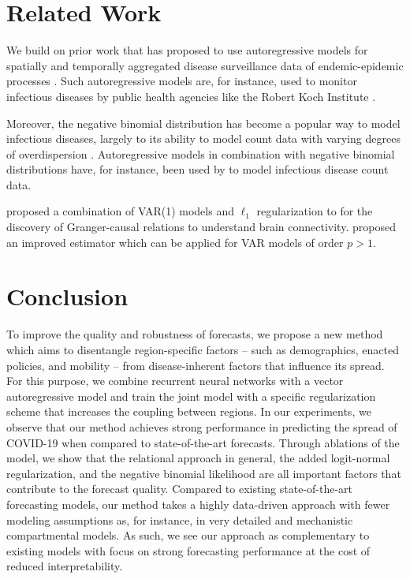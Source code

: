 \documentclass{article}
\begin{document}
\section{Related Work}
\label{sec:org3676b8c}
We build on prior work that has proposed to use autoregressive models
for spatially and temporally aggregated disease surveillance data of endemic-epidemic
processes \citep{held2005statistical,meyer2014powerlaw,meyer2016socialcontact}.
Such autoregressive models are, for instance, used to monitor infectious
diseases by public health agencies like the Robert Koch Institute
\citep{salmon2016surveillance}.

Moreover, the negative binomial distribution has become a popular way to model
infectious diseases, largely to its ability to model count data with varying degrees
of overdispersion \citep{lloyd_smith2007negativebinomial}. Autoregressive models
in combination with negative binomial distributions have, for instance, been
used by \citet{bauer2018stratified,wakefield2019spatio,held2005statistical} to
model infectious disease count data.

\citet{valdes2005estimating} proposed a combination of VAR(1) models and \(\ell_1\)
regularization to for the discovery of Granger-causal relations to understand
brain connectivity. \citet{haufe2010sparse} proposed an improved estimator which
can be applied for VAR models of order \(p > 1\).

\section{Conclusion}
\label{sec:orgf720d80}
To improve the quality and robustness of forecasts, we propose a new method
which aims to disentangle region-specific factors -- such as demographics,
enacted policies, and mobility -- from disease-inherent factors that influence
its spread. For this purpose, we combine recurrent neural networks with a vector
autoregressive model and train the joint model with a specific regularization
scheme that increases the coupling between regions. In our experiments, we
observe that our method achieves strong performance in predicting the spread of
COVID-19 when compared to state-of-the-art forecasts. Through ablations of the
model, we show that the relational approach in general, the added logit-normal
regularization, and the negative binomial likelihood are all important factors
that contribute to the forecast quality. Compared to existing state-of-the-art
forecasting models, our method takes a highly data-driven approach with fewer
modeling assumptions as, for instance, in very detailed and mechanistic
compartmental models. As such, we see our approach as complementary to existing
models with focus on strong forecasting performance at the cost of reduced
interpretability.



\end{document}
